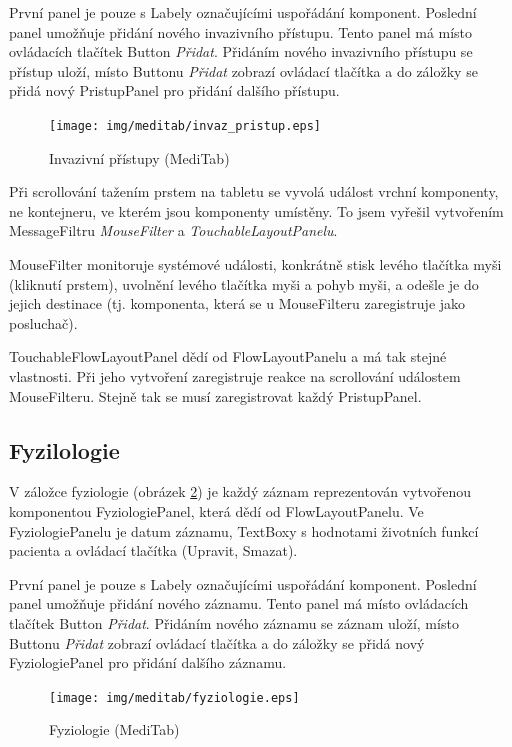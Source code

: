 První panel je pouze s Labely označujícími uspořádání komponent. Poslední panel umožňuje přidání nového invazivního přístupu. Tento panel má místo ovládacích tlačítek Button \emph{Přidat}. Přidáním nového invazivního přístupu se přístup uloží, místo Buttonu \emph{Přidat} zobrazí ovládací tlačítka a do záložky se přidá nový PristupPanel pro přidání dalšího přístupu.

\begin{figure}[H]
	\centering
	\texttt{[image: img/meditab/invaz\_pristup.eps]}
	\caption{Invazivní přístupy (MediTab)}
  \label{fig:invaz_pristup}
\end{figure}

Při scrollování tažením prstem na tabletu se vyvolá událost vrchní komponenty, ne kontejneru, ve kterém jsou komponenty umístěny. To jsem vyřešil vytvořením MessageFiltru \emph{MouseFilter} a \emph{TouchableLayoutPanelu}.

MouseFilter monitoruje systémové události, konkrátně stisk levého tlačítka myši (kliknutí prstem), uvolnění levého tlačítka myši a pohyb myši, a odešle je do jejich destinace (tj. komponenta, která se u MouseFilteru zaregistruje jako posluchač). 

TouchableFlowLayoutPanel dědí od FlowLayoutPanelu a má tak stejné vlastnosti. Při jeho vytvoření zaregistruje reakce na scrollování událostem MouseFilteru. Stejně tak se musí zaregistrovat každý PristupPanel.


\subsection{Fyzilologie}

V záložce fyziologie (obrázek \ref{fig:fyziologie}) je každý záznam reprezentován vytvořenou komponentou FyziologiePanel, která dědí od FlowLayoutPanelu. Ve FyziologiePanelu je datum záznamu, TextBoxy s hodnotami životních funkcí pacienta a ovládací tlačítka (Upravit, Smazat).

První panel je pouze s Labely označujícími uspořádání komponent. Poslední panel umožňuje přidání nového záznamu. Tento panel má místo ovládacích tlačítek Button \emph{Přidat}. Přidáním nového záznamu se záznam uloží, místo Buttonu \emph{Přidat} zobrazí ovládací tlačítka a do záložky se přidá nový FyziologiePanel pro přidání dalšího záznamu.

\begin{figure}[H]
	\centering
	\texttt{[image: img/meditab/fyziologie.eps]}
	\caption{Fyziologie (MediTab)}
  \label{fig:fyziologie}
\end{figure}

